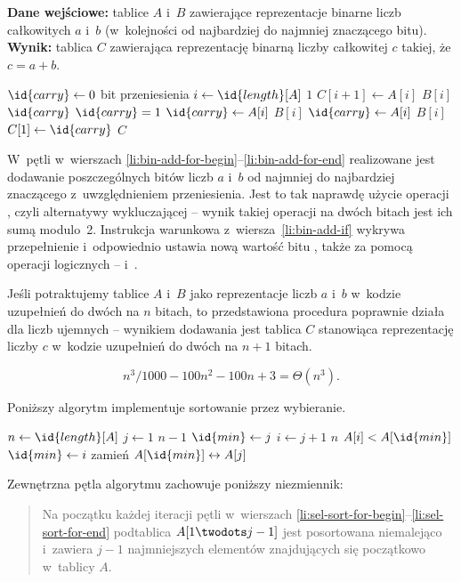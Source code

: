 \exercise %
\textbf{Dane wejściowe:}  tablice $A$ i~$B$ zawierające reprezentacje binarne  liczb całkowitych $a$ i~$b$ (w~kolejności od najbardziej do najmniej znaczącego bitu). \\
\textbf{Wynik:}  tablica $C$ zawierająca reprezentację binarną  liczby całkowitej $c$ takiej, że $c=a+b$.
\begin{codebox}
\li	$\id{carry}\gets0$ \>\>\>\>\Comment bit przeniesienia
\li	\For $i\gets\id{length}[A]$ \Downto $1$ \label{li:bin-add-for-begin}
\li		\Do
			$C[i+1]\gets A[i]$ \kw{xor} $B[i]$  $\id{carry}$ \label{li:bin-add-xor}
\li			\If $\id{carry}=1$ \label{li:bin-add-if}
\li				\Then $\id{carry}\gets A[i]$  $B[i]$
\li				\Else $\id{carry}\gets A[i]$  $B[i]$
				\End
		\End \label{li:bin-add-for-end}
\li	$C[1]\gets\id{carry}$
\li	\Return $C$
\end{codebox}

W~pętli  w~wierszach \ref{li:bin-add-for-begin}\nobreakdash--\ref{li:bin-add-for-end} realizowane jest dodawanie poszczególnych bitów liczb $a$ i~$b$ od najmniej do najbardziej znaczącego z~uwzględnieniem przeniesienia. Jest to tak naprawdę użycie operacji , czyli alternatywy wykluczającej -- wynik takiej operacji na dwóch bitach jest ich sumą modulo~2. Instrukcja warunkowa z~wiersza~\ref{li:bin-add-if} wykrywa przepełnienie i~odpowiednio ustawia nową wartość bitu , także za pomocą operacji logicznych --  i~.

Jeśli potraktujemy tablice $A$ i~$B$ jako reprezentacje liczb $a$ i~$b$ w~kodzie uzupełnień do dwóch na $n$ bitach, to przedstawiona procedura poprawnie działa dla liczb ujemnych -- wynikiem dodawania jest tablica $C$ stanowiąca reprezentację liczby $c$ w~kodzie uzupełnień do dwóch na $n+1$ bitach.


\exercise %
\[
	n^3\!/1000-100n^2-100n+3 = \Theta(n^3).
\]

\exercise %
Poniższy algorytm implementuje sortowanie przez wybieranie.
\begin{codebox}
\li	$n\gets\id{length}[A]$
\li	\For $j\gets1$ \To $n-1$ \label{li:sel-sort-for-begin}
\li		\Do
			$\id{min}\gets j$
\li			\For $i\gets j+1$ \To $n$
\li				\Do
					\If $A[i]<A[\id{min}]$
\li						\Then $\id{min}\gets i$
						\End
				\End
\li			zamień $A[\id{min}]\leftrightarrow A[j]$
		\End \label{li:sel-sort-for-end}
\end{codebox}
Zewnętrzna pętla algorytmu zachowuje poniższy niezmiennik:
\begin{quote}
Na początku każdej iteracji pętli  w~wierszach \ref{li:sel-sort-for-begin}\nobreakdash--\ref{li:sel-sort-for-end} podtablica $A[1\twodots j-1]$ jest posortowana niemalejąco i~zawiera $j-1$ najmniejszych elementów znajdujących się początkowo w~tablicy $A$.
\end{quote}

